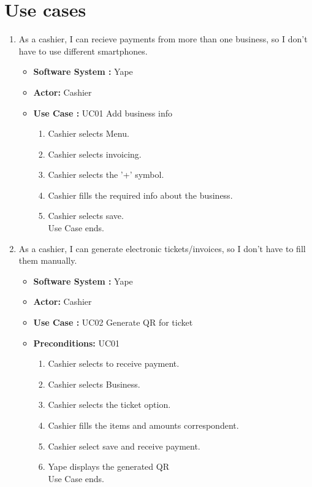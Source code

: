 \documentclass{article}
\begin{document}
\section{Use cases}

\begin{enumerate}

    \item As a cashier, I can recieve payments from more than one business, so I don't have to use different smartphones. 
    \begin{itemize}
        \item \textbf{Software System :} Yape 
        \item \textbf{Actor: } Cashier
        \item \textbf{Use Case : } UC01 Add business info
        \begin{enumerate}
            \item Cashier selects Menu.
            \item Cashier selects invoicing.
            \item Cashier selects the '+' symbol.
            \item Cashier fills the required info about the business.
            \item Cashier selects save.\\
            Use Case ends.
        \end{enumerate}
    \end{itemize}

    \item As a cashier, I can generate electronic tickets/invoices, so I don't have to fill them manually. 
    \begin{itemize}
        \item \textbf{Software System :} Yape
        \item \textbf{Actor: } Cashier
        \item \textbf{Use Case : } UC02 Generate QR for ticket
        \item \textbf{Preconditions: } UC01
	\begin{enumerate}
            \item Cashier selects to receive payment.
            \item Cashier selects Business.
            \item Cashier selects the ticket option.
            \item Cashier fills the items and amounts correspondent.
            \item Cashier select save and receive payment.
            \item Yape displays the generated QR\\
            Use Case ends.
        \end{enumerate}
    \end{itemize}
    

\end{enumerate}
\end{document}
